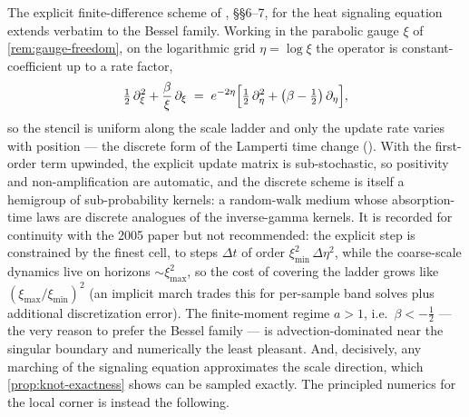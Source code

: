 \begin{remark}\label{rem:finite-differences}
The explicit finite-difference scheme of , \S\S6--7, for the
heat signaling equation extends verbatim to the Bessel family. Working in the parabolic gauge
$\xi$ of \ref{rem:gauge-freedom}, on the logarithmic grid $\eta = \log\xi$ the operator
is constant-coefficient up to a rate factor,
\[
  \tfrac12\,\partial_\xi^2 + \frac{\beta}{\xi}\,\partial_\xi
  \;=\; e^{-2\eta}\Bigl[\tfrac12\,\partial_\eta^2 + \bigl(\beta - \tfrac12\bigr)\,\partial_\eta\Bigr],
\]
so the stencil is uniform along the scale ladder and only the update rate varies with
position --- the discrete form of the Lamperti time change (). With
the first-order term upwinded, the explicit update matrix is sub-stochastic, so positivity
and non-amplification are automatic, and the discrete scheme is itself a hemigroup of
sub-probability kernels: a random-walk medium whose absorption-time laws are discrete
analogues of the inverse-gamma kernels. It is recorded for continuity with the 2005 paper but
not recommended: the explicit step is constrained by the finest cell, to steps $\Delta t$
of order $\xi_{\min}^2\,\Delta\eta^2$, while the coarse-scale dynamics live on
horizons $\sim \xi_{\max}^2$, so the cost of covering the ladder grows like
$(\xi_{\max}/\xi_{\min})^2$ (an implicit march trades this for per-sample band solves plus
additional discretization error). The
finite-moment regime $a > 1$, i.e.\ $\beta < -\tfrac12$ --- the very reason to prefer the
Bessel family --- is advection-dominated near the singular boundary and numerically the least
pleasant. And, decisively, any marching of the signaling equation approximates the scale
direction, which \ref{prop:knot-exactness} shows can be sampled exactly. The principled
numerics for the local corner is instead the following.
\end{remark}


